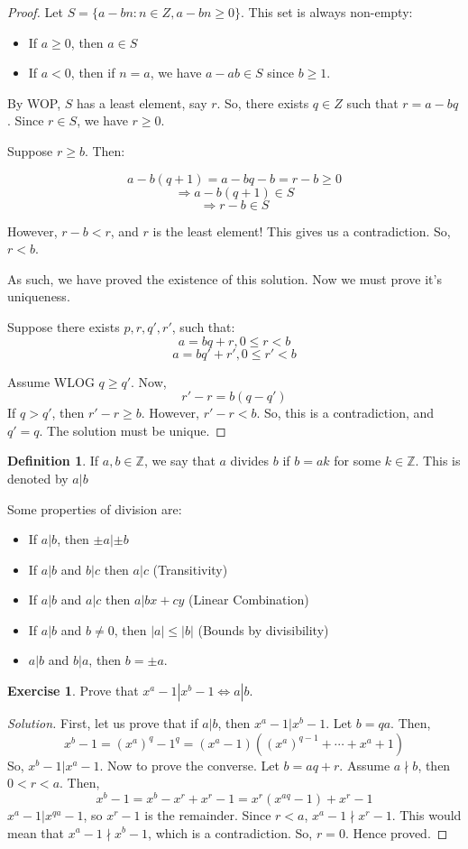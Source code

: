 \documentclass[12pt,letterpaper]{amsbook}
\theoremstyle{definition}
\newtheorem{definition}{Definition} %
\newtheorem*{exercise}{Exercise}
\newenvironment{solution}
  {\renewcommand\qedsymbol{$\blacksquare$}\begin{proof}[Solution]}
  {\end{proof}}
\newcommand{\Z}{\mathbb{Z}}
\begin{document}
\begin{proof}

Let $S = \{a - bn : n \in Z, a-bn \geq 0\}$. This set is always non-empty:
\begin{itemize}
  \item If $a \geq 0$, then $a \in S$
  \item If $a<0$, then if $n = a$, we have $a-ab \in S$ since $b \geq 1$.
\end{itemize}

By WOP, $S$ has a least element, say $r$. So, there exists $q \in Z$ such that $r = a-bq$. Since $r \in S$, we have $r \geq 0$.

Suppose $r \geq b$. Then:

\[a-b(q+1) = a-bq-b = r-b \geq 0\]
\[ \Rightarrow a-b(q+1) \in S\]
\[\Rightarrow r-b \in S\]

However, $r-b < r$, and $r$ is the least element! This gives us a contradiction. So, $r < b$.

As such, we have proved the existence of this solution. Now we must prove it's uniqueness.

Suppose there exists $p,r,q',r'$, such that:
\[a = bq+r, 0 \leq r < b\]
\[a = bq'+r', 0 \leq r' < b\]

Assume WLOG $q \geq q'$. Now,
\[r'-r = b(q-q')\]
If $q > q'$, then $r'-r \geq b$. However, $r'-r < b$. So, this is a contradiction, and $q' = q$. The solution must be unique.

\end{proof}

\begin{definition}
  If $a,b \in \Z$, we say that $a$ divides $b$ if $b=ak$ for some $k \in \Z$. This is denoted by $a|b$
\end{definition}

Some properties of division are:

\begin{itemize}
  \item If $a|b$, then $\pm a | \pm b$
  \item If $a|b$ and $b|c$ then $a|c$ (Transitivity)
  \item If $a|b$ and $a|c$ then $a|bx+cy$ (Linear Combination)
  \item If $a|b$ and $b \neq 0$, then $|a| \leq |b|$ (Bounds by divisibility)
  \item $a|b$ and $b|a$, then $b = \pm a$.
\end{itemize}

\begin{exercise}
  Prove that $x^a-1|x^b-1 \Leftrightarrow a|b$.
\end{exercise}
\begin{solution}
  First, let us prove that if $a|b$, then $x^a-1|x^b-1$. Let $b=qa$. Then,
  \[x^b-1 = (x^a)^q-1^q = (x^a-1)((x^a)^{q-1} + \cdots + x^a + 1)\]
  So, $x^b-1 | x^a-1$.
  Now to prove the converse. Let $b=aq+r$. Assume $a \nmid b$, then $0 < r < a$. Then,
  \[x^b-1 = x^b - x^r + x^r - 1 = x^r(x^{aq} - 1) + x^r-1\]
  $x^a-1|x^{qa}-1$, so $x^r-1$ is the remainder. Since $r < a$, $x^a-1 \nmid x^r-1$. This would mean that $x^a-1 \nmid x^b-1$, which is a contradiction. So, $r = 0$. Hence proved.
\end{solution}
\end{document}
